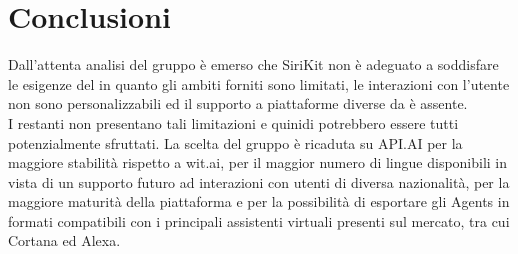 \documentclass[a4paper,titlepage]{article}
\begin{document}
	\section{Conclusioni}
	Dall'attenta analisi del gruppo \GRUPPO{} è emerso che SiriKit non è adeguato a soddisfare le esigenze del  \PROGETTO{} in quanto gli ambiti forniti sono limitati, le interazioni con l'utente non sono personalizzabili ed il supporto a piattaforme diverse da  è assente.\\
	I restanti  non presentano tali limitazioni e quinidi potrebbero essere tutti potenzialmente sfruttati. La scelta del gruppo è ricaduta su API.AI per la maggiore stabilità rispetto a wit.ai, per il  maggior numero di lingue disponibili in vista di un supporto futuro ad interazioni con utenti di diversa nazionalità, per la maggiore maturità della piattaforma e per la possibilità di esportare gli Agents in formati compatibili con i principali assistenti virtuali presenti sul mercato, tra cui Cortana ed Alexa.
	
	
	
\end{document}
